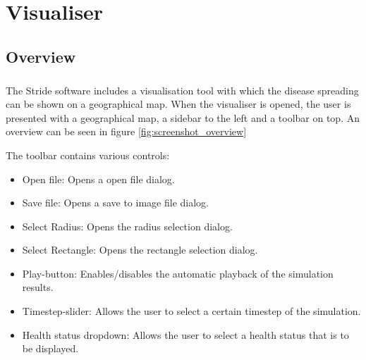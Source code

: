 \chapter{Visualiser}
\label{chap:visualiser}


\section{Overview}
\label{section:overview}

\paragraph{} The Stride software includes a visualisation tool with which the disease spreading can be shown on a geographical map. When the visualiser is opened, the user is presented with a geographical map, a sidebar to the left and a toolbar on top. An overview can be seen in figure \ref{fig:screenshot_overview}

The toolbar contains various controls:
\begin{itemize}
\item Open file: Opens a open file dialog.
\item Save file: Opens a save to image file dialog.
\item Select Radius: Opens the radius selection dialog.
\item Select Rectangle: Opens the rectangle selection dialog.
\item Play-button: Enables/disables the automatic playback of the simulation results.
\item Timestep-slider: Allows the user to select a certain timestep of the simulation.
\item Health status dropdown: Allows the user to select a health status that is to be displayed.
\end{itemize}


